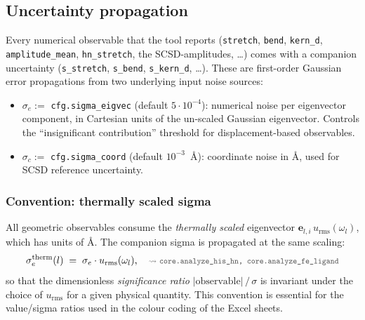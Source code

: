 \documentclass[11pt,a4paper,twoside]{article}
\newcommand{\evec}{\mathbf{e}}
\newcommand{\urms}{u_{\mathrm{rms}}}
\newcommand{\codref}[1]{%
  \quad\text{\textcolor{gray!70!black}{\footnotesize $\rightsquigarrow$~\texttt{#1}}}}
\theoremstyle{remark}
\begin{document}
\subsection{Uncertainty propagation}
\label{sec:uncertainty}

Every numerical observable that the tool reports
(\texttt{stretch}, \texttt{bend}, \texttt{kern\_d},
\texttt{amplitude\_mean}, \texttt{hn\_stretch}, the SCSD-amplitudes,
\ldots) comes with a companion uncertainty (\texttt{s\_stretch},
\texttt{s\_bend}, \texttt{s\_kern\_d}, \ldots).
These are first-order Gaussian error propagations from two underlying
input noise sources:
\begin{itemize}\setlength{\itemsep}{0pt}
  \item $\sigma_e := $ \texttt{cfg.sigma\_eigvec} (default $5\cdot 10^{-4}$):
        numerical noise per eigenvector component, in Cartesian units
        of the un-scaled Gaussian eigenvector. Controls the
        ``insignificant contribution'' threshold for displacement-based
        observables.
  \item $\sigma_c := $ \texttt{cfg.sigma\_coord} (default $10^{-3}$~\AA):
        coordinate noise in \AA{}, used for SCSD reference uncertainty.
\end{itemize}

\subsubsection*{Convention: thermally scaled sigma}
\label{sec:uncertainty-convention}

All geometric observables consume the
\emph{thermally scaled} eigenvector $\evec_{l,i}\,\urms(\omega_l)$,
which has units of \AA{}. The companion sigma is propagated at
the same scaling:
\begin{equation}
  \sigma_e^\text{therm}(l) \;=\; \sigma_e \cdot \urms(\omega_l),
  \codref{core.analyze\_his\_hn, core.analyze\_fe\_ligand}
  \label{eq:sigma-therm}
\end{equation}
so that the dimensionless \emph{significance ratio}
$|\text{observable}|\,/\,\sigma$ is invariant under the choice of
$\urms$ for a given physical quantity. This convention is essential
for the value/sigma ratios used in the colour coding of the Excel
sheets.
\end{document}
